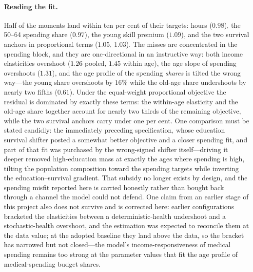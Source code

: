 \documentclass[12pt,a4paper]{article}
\begin{document}
\paragraph{Reading the fit.} Half of the moments land within ten per cent of their targets: hours ($0.98$), the 50--64 spending share ($0.97$), the young skill premium ($1.09$), and the two survival anchors in proportional terms ($1.05$, $1.03$). The misses are concentrated in the spending block, and they are one-directional in an instructive way: both income elasticities overshoot ($1.26$ pooled, $1.45$ within age), the age slope of spending overshoots ($1.31$), and the age profile of the spending \emph{shares} is tilted the wrong way---the young share overshoots by $16\%$ while the old-age share undershoots by nearly two fifths ($0.61$). Under the equal-weight proportional objective the residual is dominated by exactly these terms: the within-age elasticity and the old-age share together account for nearly two thirds of the remaining objective, while the two survival anchors carry under one per cent. One comparison must be stated candidly: the immediately preceding specification, whose education survival shifter posted a somewhat better objective and a closer spending fit, and part of that fit was purchased by the wrong-signed shifter itself---driving it deeper removed high-education mass at exactly the ages where spending is high, tilting the population composition toward the spending targets while inverting the education--survival gradient. That subsidy no longer exists by design, and the spending misfit reported here is carried honestly rather than bought back through a channel the model could not defend. One claim from an earlier stage of this project also does not survive and is corrected here: earlier configurations bracketed the elasticities between a deterministic-health undershoot and a stochastic-health overshoot, and the estimation was expected to reconcile them at the data value; at the adopted baseline they land above the data, so the bracket has narrowed but not closed---the model's income-responsiveness of medical spending remains too strong at the parameter values that fit the age profile of medical-spending budget shares.
\end{document}
